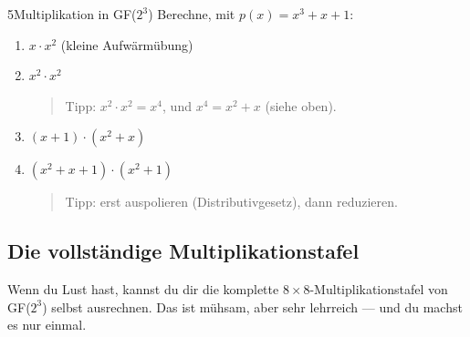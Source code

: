 \begin{bleistiftuebung}{5}{Multiplikation in GF($2^3$)}
Berechne, mit $p(x) = x^3 + x + 1$:

\begin{enumerate}[label=(\alph*), leftmargin=*]
\item $x \cdot x^2$ (kleine Aufwärmübung)
\item $x^2 \cdot x^2$

  \begin{quote}
  Tipp: $x^2 \cdot x^2 = x^4$, und $x^4 = x^2 + x$ (siehe oben).
  \end{quote}

\item $(x+1) \cdot (x^2+x)$

\item $(x^2+x+1) \cdot (x^2+1)$

  \begin{quote}
  Tipp: erst auspolieren (Distributivgesetz), dann reduzieren.
  \end{quote}
\end{enumerate}
\end{bleistiftuebung}

\subsection*{Die vollständige Multiplikationstafel}

Wenn du Lust hast, kannst du dir die komplette $8 \times 8$-Multi\-pli\-ka\-tions\-tafel
von GF($2^3$) selbst ausrechnen. Das ist mühsam, aber sehr lehrreich
— und du machst es nur einmal.

